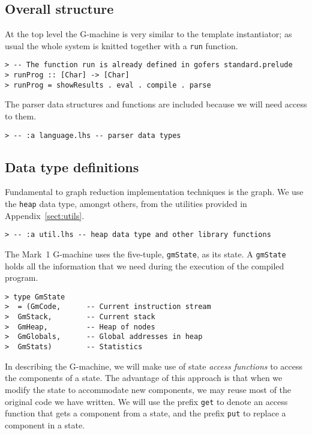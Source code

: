 \subsection{Overall structure}

At the top level the G-machine is very similar to the template instantiator;
as usual the whole system is knitted together with a \mbox{\tt run} function.
\begin{verbatim}
> -- The function run is already defined in gofers standard.prelude
> runProg :: [Char] -> [Char]
> runProg = showResults . eval . compile . parse
\end{verbatim}
%
%

The parser data structures and functions are included because we will
need access to them.
\begin{verbatim}
> -- :a language.lhs -- parser data types
\end{verbatim}
\subsection{Data type definitions}

Fundamental to graph reduction implementation techniques is the graph.
We use the \mbox{\tt heap} data type, amongst others, from the utilities
provided in Appendix~\ref{sect:utils}.
\begin{verbatim}
> -- :a util.lhs -- heap data type and other library functions
\end{verbatim}
The Mark~1 G-machine uses the five-tuple, \mbox{\tt gmState}, as its state. A
\mbox{\tt gmState} holds all the information that we need during the execution
of the compiled program.
\begin{verbatim}
> type GmState 
>  = (GmCode,      -- Current instruction stream
>  GmStack,        -- Current stack
>  GmHeap,         -- Heap of nodes
>  GmGlobals,      -- Global addresses in heap
>  GmStats)        -- Statistics
\end{verbatim}
%
In describing the G-machine, we will make use of state {\em access
functions\/} to access the components of a
state. The advantage of this approach is that when we modify the state
to accommodate new components, we may reuse most of the original code
we have written. We will use the prefix \mbox{\tt get} to denote an access
function that gets a component from a state, and the prefix \mbox{\tt put} to
replace a component in a state.

